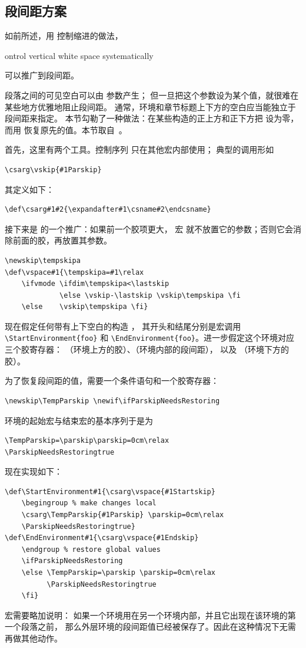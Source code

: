 \documentclass[a4paper]{rapport3}
\def\howto#1\par{}
\begin{document}
\subsection{段间距方案}
\label{skip:scheme}

如前所述，用  控制缩进的做法，
\howto Control vertical white space systematically\par
可以推广到段间距。

段落之间的可见空白可以由  参数产生；
但一旦把这个参数设为某个值，就很难在某些地方优雅地阻止段间距。
通常，环境和章节标题上下方的空白应当能独立于段间距来指定。
本节勾勒了一种做法：在某些构造的正上方和正下方把  设为零，
而用  恢复原先的值。本节取自~\cite{E4}。

首先，这里有两个工具。控制序列  只在其他宏内部使用；
典型的调用形如
\begin{verbatim}
\csarg\vskip{#1Parskip}
\end{verbatim}
其定义如下：\begin{verbatim}
\def\csarg#1#2{\expandafter#1\csname#2\endcsname}
\end{verbatim}
接下来是  的一个推广：如果前一个胶项更大，
宏  就不放置它的参数；否则它会消除前面的胶，再放置其参数。\begin{verbatim}
\newskip\tempskipa
\def\vspace#1{\tempskipa=#1\relax
    \ifvmode \ifdim\tempskipa<\lastskip 
             \else \vskip-\lastskip \vskip\tempskipa \fi
    \else    \vskip\tempskipa \fi}
\end{verbatim}
    
现在假定任何带有上下空白的构造 ，
其开头和结尾分别是宏调用 \verb>\StartEnvironment{foo}> 和
\verb>\EndEnvironment{foo}>。进一步假定这个环境对应三个胶寄存器：
（环境上方的胶）、（环境内部的段间距），
以及 （环境下方的胶）。

为了恢复段间距的值，需要一个条件语句和一个胶寄存器：\begin{verbatim}
\newskip\TempParskip \newif\ifParskipNeedsRestoring
\end{verbatim}
环境的起始宏与结束宏的基本序列于是为
\begin{verbatim}
\TempParskip=\parskip\parskip=0cm\relax
\ParskipNeedsRestoringtrue
\end{verbatim}

现在实现如下：\begin{verbatim}
\def\StartEnvironment#1{\csarg\vspace{#1Startskip}
    \begingroup % make changes local
    \csarg\TempParskip{#1Parskip} \parskip=0cm\relax
    \ParskipNeedsRestoringtrue}
\def\EndEnvironment#1{\csarg\vspace{#1Endskip}
    \endgroup % restore global values
    \ifParskipNeedsRestoring
    \else \TempParskip=\parskip \parskip=0cm\relax
          \ParskipNeedsRestoringtrue
    \fi}
\end{verbatim}
 宏需要略加说明：
如果一个环境用在另一个环境内部，并且它出现在该环境的第一个段落之前，
那么外层环境的段间距值已经被保存了。因此在这种情况下无需再做其他动作。
\end{document}
